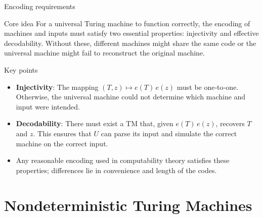 \begin{frame}[t]{Encoding requirements}
  \begin{tblock}{Core idea}
    For a universal Turing machine to function correctly, the encoding
    of machines and inputs must satisfy two essential properties:
    injectivity and effective decodability.  Without these, different
    machines might share the same code or the universal machine might
    fail to reconstruct the original machine.
  \end{tblock}
  \begin{tblock}{Key points}
    \begin{itemize}
      \item \textbf{Injectivity}: The mapping $(T,z)\mapsto e(T)\,e(z)$ must
        be one‑to‑one.  Otherwise, the universal machine could not
        determine which machine and input were intended.
      \item \textbf{Decodability}: There must exist a TM that, given
        $e(T)\,e(z)$, recovers $T$ and $z$.  This ensures that $U$ can
        parse its input and simulate the correct machine on the correct
        input.
      \item Any reasonable encoding used in computability theory
        satisfies these properties; differences lie in convenience and
        length of the codes.
    \end{itemize}
  \end{tblock}
  \label{fr:7.8-14}
\end{frame}

%

\section{Nondeterministic Turing Machines}

